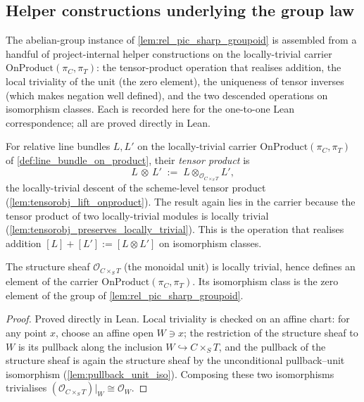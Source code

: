 \subsection{Helper constructions underlying the group law}
\label{subsec:relpic_group_helpers}

The abelian-group instance of \cref{lem:rel_pic_sharp_groupoid} is assembled
from a handful of project-internal helper constructions on the locally-trivial
carrier \(\mathrm{OnProduct}(\pi_C, \pi_T)\): the tensor-product operation that
realises addition, the local triviality of the unit (the zero element), the
uniqueness of tensor inverses (which makes negation well defined), and the two
descended operations on isomorphism classes. Each is recorded here for the
one-to-one Lean correspondence; all are proved directly in Lean.

\begin{definition}\leanok
  \label{def:rel_tensor_obj}
  For relative line bundles \(L, L'\) on the locally-trivial carrier
  \(\mathrm{OnProduct}(\pi_C, \pi_T)\) of \cref{def:line_bundle_on_product},
  their \emph{tensor product} is
  \[
    L \,\mathbin{\otimes}\, L' \;:=\;
      L \otimes_{\mathcal{O}_{C \times_S T}} L',
  \]
  the locally-trivial descent of the scheme-level tensor product
  (\cref{lem:tensorobj_lift_onproduct}). The result again lies in the carrier
  because the tensor product of two locally-trivial modules is locally trivial
  (\cref{lem:tensorobj_preserves_locally_trivial}). This is the operation that
  realises addition \([L] + [L'] := [L \otimes L']\) on isomorphism classes.
\end{definition}

\begin{lemma}\leanok
  \label{lem:rel_pic_sharp_unit_loctriv}
  The structure sheaf \(\mathcal{O}_{C \times_S T}\) (the monoidal unit) is
  locally trivial, hence defines an element of the carrier
  \(\mathrm{OnProduct}(\pi_C, \pi_T)\). Its isomorphism class is the zero
  element of the group of \cref{lem:rel_pic_sharp_groupoid}.
\end{lemma}

\begin{proof}
  \leanok
  Proved directly in Lean. Local triviality is checked on an affine chart: for
  any point \(x\), choose an affine open \(W \ni x\); the restriction of the
  structure sheaf to \(W\) is its pullback along the inclusion
  \(W \hookrightarrow C \times_S T\), and the pullback of the structure sheaf is
  again the structure sheaf by the unconditional pullback--unit isomorphism
  (\cref{lem:pullback_unit_iso}). Composing these two isomorphisms trivialises
  \((\mathcal{O}_{C \times_S T})|_W \cong \mathcal{O}_W\).
\end{proof}

